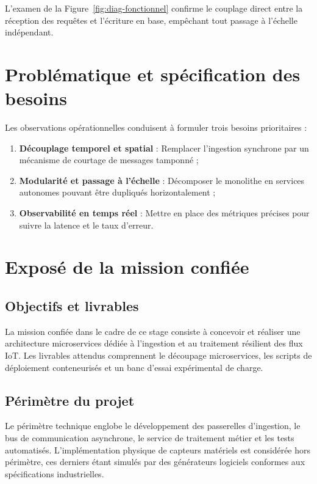L'examen de la Figure~\ref{fig:diag-fonctionnel} confirme le couplage direct entre la r\'eception des requ\^etes et l'\'ecriture en base, emp\^echant tout passage \`a l'\'echelle ind\'ependant.

\section{Probl\'ematique et sp\'ecification des besoins}
Les observations op\'erationnelles conduisent \`a formuler trois besoins prioritaires :
\begin{enumerate}
    \item \textbf{D\'ecouplage temporel et spatial} : Remplacer l'ingestion synchrone par un m\'ecanisme de courtage de messages tamponn\'e ;
    \item \textbf{Modularit\'e et passage \`a l'\'echelle} : D\'ecomposer le monolithe en services autonomes pouvant \^etre dupliqu\'es horizontalement ;
    \item \textbf{Observabilit\'e en temps r\'eel} : Mettre en place des m\'etriques pr\'ecises pour suivre la latence et le taux d'erreur.
\end{enumerate}

\section{Expos\'e de la mission confi\'ee}
\subsection{Objectifs et livrables}
La mission confi\'ee dans le cadre de ce stage consiste \`a concevoir et r\'ealiser une architecture microservices d\'edi\'ee \`a l'ingestion et au traitement r\'esilient des flux IoT. Les livrables attendus comprennent le d\'ecoupage microservices, les scripts de d\'eploiement conteneuris\'es et un banc d'essai exp\'erimental de charge.

\subsection{P\'erim\`etre du projet}
Le p\'erim\`etre technique englobe le d\'eveloppement des passerelles d'ingestion, le bus de communication asynchrone, le service de traitement m\'etier et les tests automatis\'es. L'impl\'ementation physique de capteurs mat\'eriels est consid\'er\'ee hors p\'erim\`etre, ces derniers \'etant simul\'es par des g\'en\'erateurs logiciels conformes aux sp\'ecifications industrielles.

